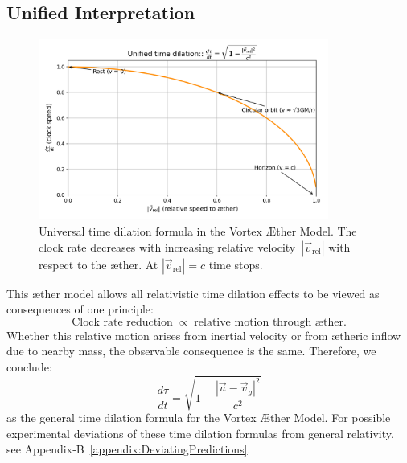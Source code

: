 \subsection*{Unified Interpretation}

\begin{figure}[htbp]
    \centering
    \includegraphics[width=0.85\textwidth]{images/11-TijdsvertragingRelatieveBeweging}
    \caption{Universal time dilation formula in the Vortex Æther Model. The clock rate decreases with increasing relative velocity~$|\vec{v}_{\mathrm{rel}}|$ with respect to the æther. At $|\vec{v}_{\mathrm{rel}}| = c$ time stops.}
    \label{fig:TijdsvertragingRelatieveBeweging}
\end{figure}

This æther model allows all relativistic time dilation effects to be viewed as consequences of one principle:
\[
\text{Clock rate reduction} \;\propto\; \text{relative motion through æther}.
\]
Whether this relative motion arises from inertial velocity or from ætheric inflow due to nearby mass, the observable consequence is the same. Therefore, we conclude:
\[
\boxed{\frac{d\tau}{dt} = \sqrt{1 - \frac{|\vec{u} - \vec{v}_g|^2}{c^2}}}
\]
as the general time dilation formula for the Vortex Æther Model.
For possible experimental deviations of these time dilation formulas from general relativity, see Appendix-B~\ref{appendix:DeviatingPredictions}.